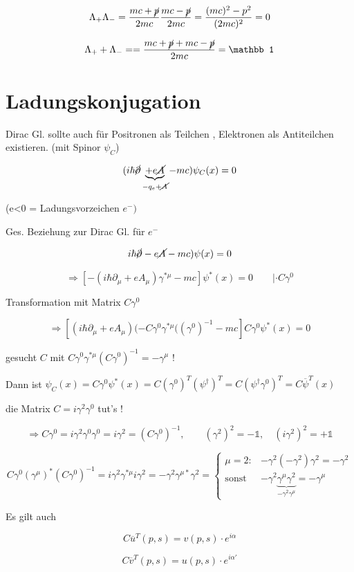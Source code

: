 \[ \Lambda_+\Lambda_- = \frac{mc+\cancel p}{2mc}\frac{mc-\cancel p}{2mc} = \frac{(mc)^2-p^2}{(2mc)^2} = 0 \]

\[ \Lambda_++\Lambda_- = = \frac{mc+\cancel p + mc - \cancel p}{2mc} = \mathbb 1 \]


\section{Ladungskonjugation}

Dirac Gl. sollte auch für Positronen als Teilchen , Elektronen als Antiteilchen existieren. (mit Spinor \(\psi_C\))

\[(i\hbar \cancel \partial\underbrace{+e\cancel A}_{-q_e+\cancel A}-mc)\psi_C(x) = 0\]

(e<0 = Ladungsvorzeichen \(e^-)\)

Ges. Beziehung zur Dirac Gl. für \(e^-\)

\[ i\hbar\cancel \partial - e\cancel A - mc)\psi(x) = 0 \]

\[\Rightarrow [-(i\hbar\partial_\mu+eA_\mu)\gamma^{*\mu} - mc]\psi^*(x) = 0\qquad |\cdot C\gamma^0\]

Transformation mit Matrix \(C\gamma^0\)

\[\Rightarrow  [(i\hbar\partial_\mu+eA_\mu)(-C\gamma^0\gamma^{*\mu}((\gamma^0)^{-1} - mc]C\gamma^0\psi^*(x) = 0  \]


gesucht \(C\) mit \( C\gamma^0\gamma^{*\mu} (C\gamma^0)^{-1} = -\gamma^\mu\) !

Dann ist \(\psi_C (x) = C\gamma^0\psi^*(x) = C(\gamma^0)^T(\psi^\dagger)^T = C(\psi^\dagger\gamma^0)^T = C\overline \psi^T(x)\)

die Matrix \(C=i\gamma^2\gamma^0\) tut's !

\[\Rightarrow C\gamma^0 = i\gamma^2\gamma^0\gamma^0 = i\gamma^2 = (C\gamma^0)^{-1},\qquad (\gamma^2)^2 = -\mathbb 1, \quad (i\gamma^2)^2 = +\mathbb 1\]

\[C\gamma^0(\gamma^\mu)^*(C\gamma^0)^{-1} = i\gamma^2\gamma^{*\mu}i\gamma^2 = -\gamma^2\gamma^{\mu*}\gamma^2 = \begin{cases}
  \mu = 2:  & -\gamma^2(-\gamma^2)\gamma^2 = -\gamma^2\\
  \text{sonst }&-\gamma^2\underbrace{\gamma^\mu\gamma^2}_{-\gamma^2\gamma^\mu} = -\gamma^\mu
\end{cases}\]

Es gilt auch

\[C\overline u^T (p,s) = v(p,s) \cdot e^{i\alpha}\]

\[C\overline v^T (p,s) = u(p,s) \cdot e^{i\alpha'}\]

